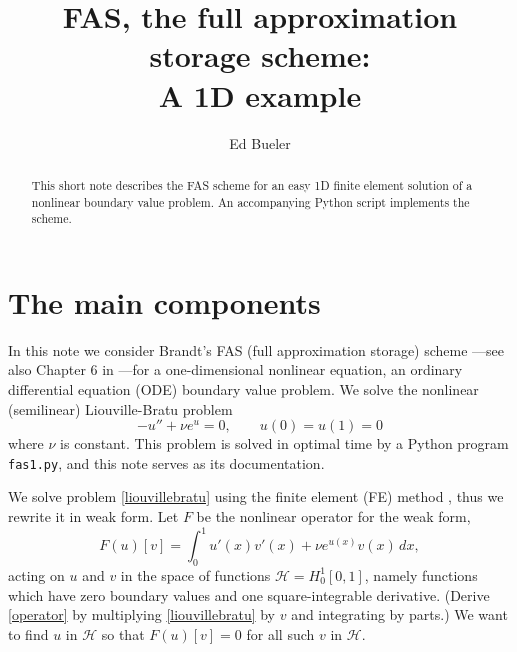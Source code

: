 \documentclass[letterpaper,final,12pt,reqno]{amsart}
\begin{document}
\title[FAS, the full approximation storage scheme]{FAS, the full approximation storage scheme: \\ A 1D example}

\author{Ed Bueler}

\begin{abstract}  This short note describes the FAS scheme for an easy 1D finite element solution of a nonlinear boundary value problem.  An accompanying Python script implements the scheme.
\end{abstract}

\maketitle

\thispagestyle{empty}
\bigskip

\section{The main components}

In this note we consider Brandt's FAS (full approximation storage) scheme \cite{Brandt1977}---see also Chapter 6 in \cite{Briggsetal2000}---for a one-dimensional nonlinear equation, an ordinary differential equation (ODE) boundary value problem.  We solve the nonlinear (semilinear) Liouville-Bratu problem \cite[for example]{Bueler2021}
\begin{equation}
  -u'' + \nu e^u = 0,  \qquad u(0) = u(1) = 0  \label{liouvillebratu}
\end{equation}
where $\nu$ is constant.  This problem is solved in optimal time by a Python program \texttt{fas1.py}, and this note serves as its documentation.

We solve problem \eqref{liouvillebratu} using the finite element (FE) method \cite{Bueler2021,Elmanetal2014}, thus we rewrite it in weak form.  Let $F$ be the nonlinear operator for the weak form,
\begin{equation}
  F(u)[v] = \int_0^1 u'(x) v'(x) + \nu e^{u(x)} v(x)\, dx,  \label{operator}
\end{equation}
acting on $u$ and $v$ in the space of functions $\mathcal{H}=H_0^1[0,1]$, namely functions which have zero boundary values and one square-integrable derivative.  (Derive \eqref{operator} by multiplying \eqref{liouvillebratu} by $v$ and integrating by parts.)  We want to find $u$ in $\mathcal{H}$ so that $F(u)[v] = 0$ for all such $v$ in $\mathcal{H}$.
\end{document}
